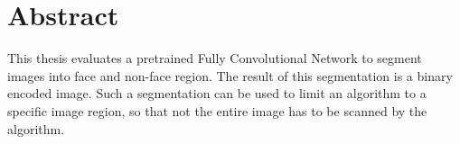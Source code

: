 \chapter{Abstract}
This thesis evaluates a pretrained Fully Convolutional Network to segment images into face and non-face region. The result of this segmentation is a binary encoded image. Such a segmentation can be used to limit an algorithm to a specific image region, so that not the entire image has to be scanned by the algorithm. \\ \\

\lipsum[1-3]